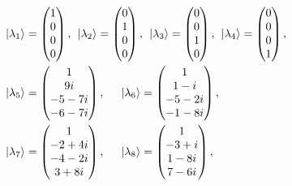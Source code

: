 \documentclass[aps,pra,reprint,groupedaddress,showkeys]{revtex4-1}
\begin{document}
\begin{equation}\label{r2}
\begin{split}
&\ket{\lambda_1} = \begin{pmatrix} 1 \\ 0 \\ 0 \\ 0 \end{pmatrix}, \hspace{0.15cm} \ket{\lambda_2} = \begin{pmatrix} 0  \\ 1 \\ 0 \\0 \end{pmatrix}, \hspace{0.15cm} \ket{\lambda_3} = \begin{pmatrix} 0  \\ 0 \\ 1 \\0 \end{pmatrix}, \hspace{0.15cm} \ket{\lambda_4} = \begin{pmatrix} 0  \\ 0 \\ 0 \\1 \end{pmatrix},\\
&\ket{\lambda_5} = \begin{pmatrix} 1 \\ 9 i \\ -5 - 7 i \\ -6- 7i \end{pmatrix}, \hspace{0.5cm} \ket{\lambda_6} = \begin{pmatrix} 1  \\ 1-i \\ -5-2 i \\-1-8i \end{pmatrix},\\
& \ket{\lambda_7} = \begin{pmatrix} 1  \\-2+ 4 i \\ -4 - 2 i \\ 3 + 8 i \end{pmatrix},\hspace{0.5cm} \ket{\lambda_8} =\begin{pmatrix} 1  \\ -3+ i \\ 1-8 i \\7-6 i \end{pmatrix},\\

\end{split}
\end{equation}
\end{document}
